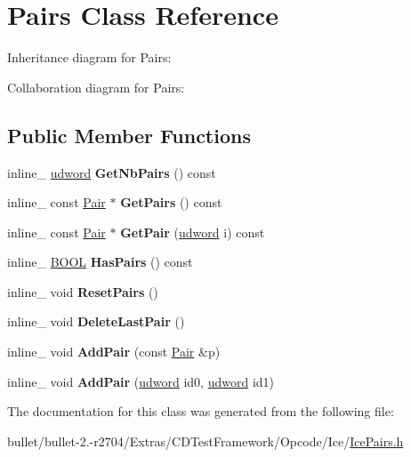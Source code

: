 \hypertarget{class_pairs}{\section{Pairs Class Reference}
\label{class_pairs}
}


Inheritance diagram for Pairs\+:


Collaboration diagram for Pairs\+:
\subsection*{Public Member Functions}
\begin{DoxyCompactItemize}
\item 
\hypertarget{class_pairs_a9201b00bc05c79f7334b8b5c6a90f787}{inline\+\_\+ \hyperlink{_ice_types_8h_a44c6f1920ba5551225fb534f9d1a1733}{udword} {\bfseries Get\+Nb\+Pairs} () const }\label{class_pairs_a9201b00bc05c79f7334b8b5c6a90f787}

\item 
\hypertarget{class_pairs_a6c8b74acf325318c400aa7a3fd6d295f}{inline\+\_\+ const \hyperlink{struct_pair}{Pair} $\ast$ {\bfseries Get\+Pairs} () const }\label{class_pairs_a6c8b74acf325318c400aa7a3fd6d295f}

\item 
\hypertarget{class_pairs_a135f82ecd87457b29ed427ed0475e8a6}{inline\+\_\+ const \hyperlink{struct_pair}{Pair} $\ast$ {\bfseries Get\+Pair} (\hyperlink{_ice_types_8h_a44c6f1920ba5551225fb534f9d1a1733}{udword} i) const }\label{class_pairs_a135f82ecd87457b29ed427ed0475e8a6}

\item 
\hypertarget{class_pairs_a1572b4e19897022d0b3c3860e8f44c0c}{inline\+\_\+ \hyperlink{_ice_types_8h_a050c65e107f0c828f856a231f4b4e788}{B\+O\+O\+L} {\bfseries Has\+Pairs} () const }\label{class_pairs_a1572b4e19897022d0b3c3860e8f44c0c}

\item 
\hypertarget{class_pairs_a8a7f05f4bca0be313bd7b54f490d1612}{inline\+\_\+ void {\bfseries Reset\+Pairs} ()}\label{class_pairs_a8a7f05f4bca0be313bd7b54f490d1612}

\item 
\hypertarget{class_pairs_a9ead31fc8e7b2cd255a6e7c2e05489c6}{inline\+\_\+ void {\bfseries Delete\+Last\+Pair} ()}\label{class_pairs_a9ead31fc8e7b2cd255a6e7c2e05489c6}

\item 
\hypertarget{class_pairs_ace27a4afb4fd2e3a5ad5dc819afb79ff}{inline\+\_\+ void {\bfseries Add\+Pair} (const \hyperlink{struct_pair}{Pair} \&p)}\label{class_pairs_ace27a4afb4fd2e3a5ad5dc819afb79ff}

\item 
\hypertarget{class_pairs_a19f74d2f1adefafd827b749c06b0682c}{inline\+\_\+ void {\bfseries Add\+Pair} (\hyperlink{_ice_types_8h_a44c6f1920ba5551225fb534f9d1a1733}{udword} id0, \hyperlink{_ice_types_8h_a44c6f1920ba5551225fb534f9d1a1733}{udword} id1)}\label{class_pairs_a19f74d2f1adefafd827b749c06b0682c}

\end{DoxyCompactItemize}


The documentation for this class was generated from the following file\+:\begin{DoxyCompactItemize}
\item 
bullet/bullet-\/2.-\/r2704/\+Extras/\+C\+D\+Test\+Framework/\+Opcode/\+Ice/\hyperlink{_ice_pairs_8h}{Ice\+Pairs.\+h}\end{DoxyCompactItemize}
